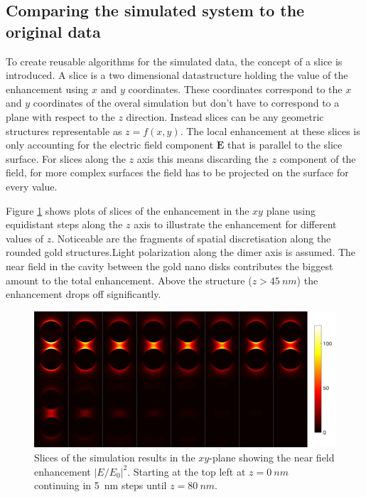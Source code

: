 \subsection{Comparing the simulated system to the original data}

To create reusable algorithms for the simulated data, the concept of a slice is introduced. A slice is a two dimensional datastructure holding the value of the enhancement using $x$ and $y$ coordinates. These coordinates correspond to the $x$ and $y$ coordinates of the overal simulation but don't have to correspond to a plane with respect to the $z$ direction. Instead slices can be any geometric structures representable as $z=f(x,y)$. The local enhancement at these slices is only accounting for the electric field component $\mathbf{E}$ that is parallel to the slice surface. For slices along the $z$ axis this means discarding the $z$ component of the field, for more complex surfaces the field has to be projected on the surface for every value.

Figure \ref{fig:slices} shows plots of slices of the enhancement in the $xy$ plane using equidistant steps along the $z$ axis to illustrate the enhancement for different values of $z$. Noticeable are the fragments of spatial discretisation along the rounded gold structures.Light polarization along the dimer axis is assumed. The near field in the cavity between the gold nano disks contributes the biggest amount to the total enhancement. Above the structure ($z>\SI{45}{nm}$) the enhancement drops off significantly.

\begin{figure}[!h]
  \includegraphics[width=\textwidth]{./images/simulation-slices.png}
  \caption{Slices of the simulation results in the $x y$-plane showing the near field enhancement $|E/E_0|^2$. Starting at the top left at $z=\SI{0}{nm}$ continuing in \SI{5}{nm} steps until $z=\SI{80}{nm}$.}
  \label{fig:slices}
\end{figure}
